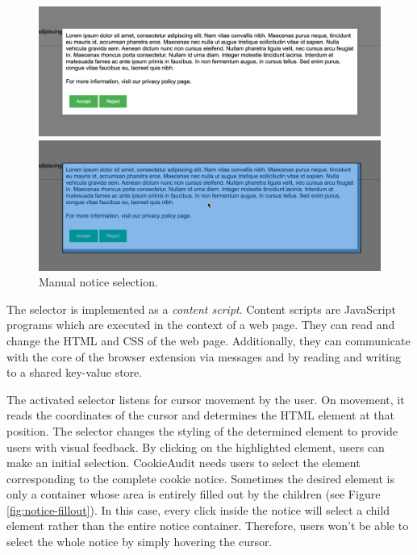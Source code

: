 \begin{figure}
	\centering
	\begin{minipage}{0.48\textwidth}
		\centering
		\includegraphics[width=1.0\linewidth]{media/screenshot_unselected.png}
	\end{minipage}\hfill
	\begin{minipage}{0.48\textwidth}
		\centering
		\includegraphics[width=1.0\linewidth]{media/screenshot_selected.png}      
	\end{minipage}
	\caption{Manual notice selection.}
	\label{fig:screenshot-selection}
\end{figure}

The selector is implemented as a \emph{content script}. Content scripts are JavaScript programs which are executed in the context of a web page. 
They can read and change the HTML and CSS of the web page. 
Additionally, they can communicate with the core of the browser extension via messages and by reading and writing to a shared key-value store.

The activated selector listens for cursor movement by the user. 
On movement, it reads the coordinates of the cursor and determines the HTML element at that position.
The selector changes the styling of the determined element to provide users with visual feedback.
By clicking on the highlighted element, users can make an initial selection.
CookieAudit needs users to select the element corresponding to the complete cookie notice. 
Sometimes the desired element is only a container whose area is entirely filled out by the children (see Figure \ref{fig:notice-fillout}).
In this case, every click inside the notice will select a child element rather than the entire notice container. 
Therefore, users won't be able to select the whole notice by simply hovering the cursor.

